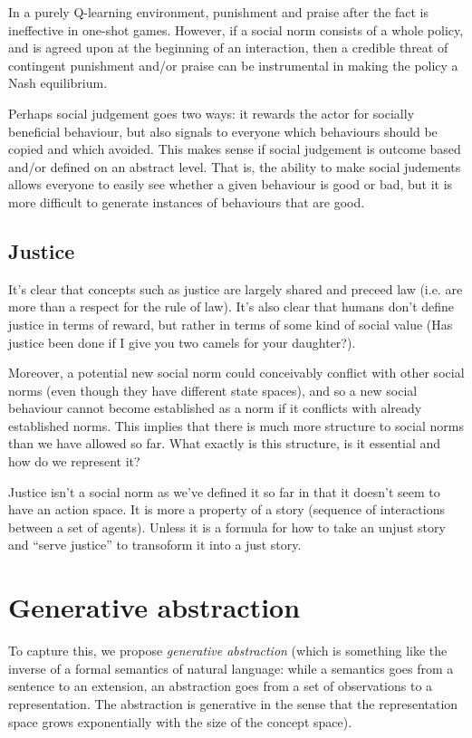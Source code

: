 \documentclass[a4paper]{article}
\begin{document}
In a purely Q-learning environment, punishment and praise after the fact is ineffective in one-shot games. However, if a social norm consists of a whole policy, and is agreed upon at the beginning of an interaction, then a credible threat of contingent punishment and/or praise can be instrumental in making the policy a Nash equilibrium.

Perhaps social judgement goes two ways: it rewards the actor for socially beneficial behaviour, but also signals to everyone which behaviours should be copied and which avoided. This makes sense if social judgement is outcome based and/or defined on an abstract level. That is, the ability to make social judements allows everyone to easily see whether a given behaviour is good or bad, but it is more difficult to generate instances of behaviours that are good.

\subsection{Justice}

It's clear that concepts such as justice are largely shared and preceed law (i.e. are more than a respect for the rule of law). It's also clear that humans don't define justice in terms of reward, but rather in terms of some kind of social value (Has justice been done if I give you two camels for your daughter?).

Moreover, a potential new social norm could conceivably conflict with other social norms (even though they have different state spaces), and so a new social behaviour cannot become established as a norm if it conflicts with already established norms. This implies that there is much more structure to social norms than we have allowed so far. What exactly is this structure, is it essential and how do we represent it?

Justice isn't a social norm as we've defined it so far in that it doesn't seem to have an action space. It is more a property of a story (sequence of interactions between a set of agents). Unless it is a formula for how to take an unjust story and ``serve justice'' to transoform it into a just story.

\section{Generative abstraction}

To capture this, we propose \textit{generative abstraction} (which is something like the inverse of a formal semantics of natural language: while a semantics goes from a sentence to an extension, an abstraction goes from a set of observations to a representation. The abstraction is generative in the sense that the representation space grows exponentially with the size of the concept space).
\end{document}
